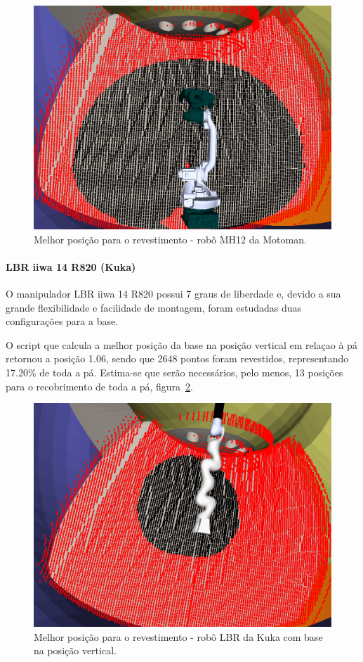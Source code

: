 \begin{figure}[h!]	
	\includegraphics[width=\columnwidth]{detail/figs/bighatch/mh12_bestpos.png}
	\caption{Melhor posição para o revestimento - robô MH12 da Motoman.}
	\label{fig::mh12bestpos}
\end{figure}


\paragraph{LBR iiwa 14 R820 (Kuka)}
O manipulador LBR iiwa 14 R820 possui 7 graus de liberdade e, devido a sua
grande flexibilidade e facilidade de montagem, foram estudadas duas
configurações para a base.

O script que calcula a melhor posição da base na posição vertical em relaçao à
pá retornou a posição 1.06, sendo que 2648 pontos foram revestidos,
representando 17.20\% de toda a pá. Estima-se que serão necessários, pelo menos,
13 posições para o recobrimento de toda a pá, figura~\ref{fig::lbrbestposv}.

\begin{figure}[h!]	
	\includegraphics[width=\columnwidth]{detail/figs/bighatch/lbr_bestposv.png}
	\caption{Melhor posição para o revestimento - robô LBR da Kuka com base na
	posição vertical.}
	\label{fig::lbrbestposv}
\end{figure}

